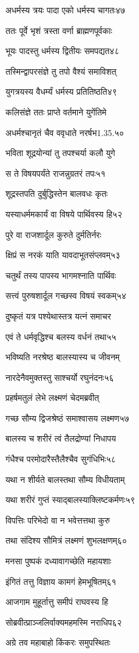 अधर्मस्य त्रयः पादा एको धर्मस्य चागतः४७

ततः पूर्वे भृशं त्रस्ता वर्णा ब्राह्मणपूर्वकाः

भूयः पादस्तु धर्मस्य द्वितीयः समपद्यत४८

तस्मिन्द्वापरसंज्ञे तु तपो वैश्यं समाविशत्

युगत्रयस्य वैधर्म्यं धर्मस्य प्रतितिष्ठति४९

कलिसंज्ञे ततः प्राप्ते वर्तमाने युगेंतिमे

अधर्मश्चानृतं चैव ववृधाते नरर्षभ1.35.५०

भविता शूद्रयोन्यां तु तपश्चर्या कलौ युगे

स ते विषयपर्यंते राजन्नुग्रतरं तपः५१

शूद्रस्तपति दुर्बुद्धिस्तेन बालवधः कृतः

यस्याधर्ममकार्यं वा विषये पार्थिवस्य हि५२

पुरे वा राजशार्दूल कुरुते दुर्मतिर्नरः

क्षिप्रं स नरकं याति यावदाभूतसंप्लवम्५३

चतुर्थं तस्य पापस्य भागमश्नाति पार्थिवः

सत्त्वं पुरुषशार्दूल गच्छस्व विषयं स्वकम्५४

दुष्कृतं यत्र पश्येथास्तत्र यत्नं समाचर

एवं ते धर्मवृद्धिश्च बलस्य वर्धनं तथा५५

भविष्यति नरश्रेष्ठ बालस्यास्य च जीवनम्

नारदेनैवमुक्तस्तु साश्चर्यो रघुनंदनः५६

प्रहर्षमतुलं लेभे लक्ष्मणं चेदमब्रवीत्

गच्छ सौम्य द्विजश्रेष्ठं समाश्वासय लक्ष्मण५७

बालस्य च शरीरं त्वं तैलद्रोण्यां निधापय

गंधैश्च परमोदारैस्तैलैश्चैव सुगंधिभिः५८

यथा न शीर्यते बालस्तथा सौम्य विधीयताम्

यथा शरीरं गुप्तं स्याद्बालस्याक्लिष्टकर्मणः५९

विपत्तिः परिभेदो वा न भवेत्तत्तथा कुरु

तथा संदिश्य सौमित्रं लक्ष्मणं शुभलक्षणम्६०

मनसा पुष्पकं दध्यावागच्छेति महायशाः

इंगितं तत्तु विज्ञाय कामगं हेमभूषितम्६१

आजगाम मुहूर्तात्तु समीपं राघवस्य हि

सोब्रवीत्प्राञ्जलिर्वाक्यमहमस्मि नराधिप६२

अग्रे तव महाबाहो किंकरः समुपस्थितः

